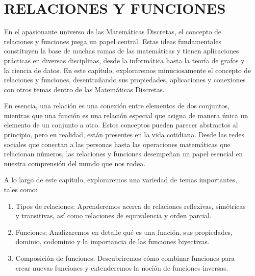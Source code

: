 \chapterspaceabove{6.75cm} %
\chapterspacebelow{7.25cm} %


\chapter{RELACIONES Y FUNCIONES}\label{chap:5}


En el apasionante universo de las Matemáticas Discretas, el concepto de relaciones y funciones juega un papel central. Estas ideas fundamentales constituyen la base de muchas ramas de las matemáticas y tienen aplicaciones prácticas en diversas disciplinas, desde la informática hasta la teoría de grafos y la ciencia de datos. En este capítulo, exploraremos minuciosamente el concepto de relaciones y funciones, desentrañando sus propiedades, aplicaciones y conexiones con otros temas dentro de las Matemáticas Discretas.


En esencia, una relación es una conexión entre elementos de dos conjuntos, mientras que una función es una relación especial que asigna de manera única un elemento de un conjunto a otro. Estos conceptos pueden parecer abstractos al principio, pero en realidad, están presentes en la vida cotidiana. Desde las redes sociales que conectan a las personas hasta las operaciones matemáticas que relacionan números, las relaciones y funciones desempeñan un papel esencial en nuestra comprensión del mundo que nos rodea.


A lo largo de este capítulo, exploraremos una variedad de temas importantes, tales como:

\begin{enumerate}
    \item Tipos de relaciones: Aprenderemos acerca de relaciones reflexivas, simétricas y transitivas, así como relaciones de equivalencia y orden parcial.
    \item Funciones: Analizaremos en detalle qué es una función, sus propiedades, dominio, codominio y la importancia de las funciones biyectivas.
    \item Composición de funciones: Descubriremos cómo combinar funciones para crear nuevas funciones y entenderemos la noción de funciones inversas.
\end{enumerate}

